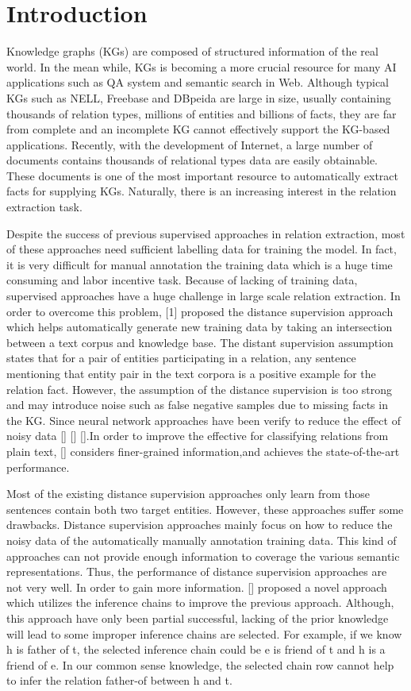 \section{Introduction}
Knowledge graphs (KGs) are composed of structured information of the real world. In the mean while, KGs is becoming a more crucial resource for many AI applications such as QA system and semantic search in Web. Although typical KGs such as NELL, Freebase and DBpeida are large in size, usually containing thousands of relation types, millions of entities and billions of facts, they are far from complete and an incomplete KG cannot effectively support the KG-based applications. Recently, with the development of Internet, a large number of documents contains thousands of relational types data are easily obtainable. These documents is one of the most important resource to automatically extract facts for supplying KGs. Naturally, there is an increasing interest in the relation extraction task.

Despite the success of previous supervised approaches in relation extraction, most of these approaches need sufficient labelling data for training the model. In fact, it is very difficult for manual annotation the training data which is a huge time consuming and labor incentive task. Because of lacking of training data, supervised approaches have a huge challenge in large scale relation extraction. In order to overcome this problem, [1] proposed the distance supervision approach which helps automatically generate new training data by taking an intersection between a text corpus and knowledge base. The distant supervision assumption states that for a pair of entities participating in a relation, any sentence mentioning that entity pair in the text corpora is a positive example for the relation fact. However, the assumption of the distance supervision is too strong and may introduce noise such as false negative samples due to missing facts in the KG. Since neural network approaches have been verify to reduce the effect of noisy data [] [] [].In order to improve the effective for classifying relations from plain text, [] considers finer-grained information,and achieves the state-of-the-art performance.

Most of the existing distance supervision approaches only learn from those sentences contain both two target entities. However, these approaches suffer some drawbacks. Distance supervision approaches mainly focus on how to reduce the noisy data of the automatically manually annotation training data. This kind of approaches can not provide enough information to coverage the various semantic representations. Thus, the performance of distance supervision approaches are not very well. In order to gain more information. [] proposed a novel approach which utilizes the inference chains to improve the previous approach. Although, this approach have only been partial successful, lacking of the prior knowledge will lead to some improper inference chains are selected. For example, if we know h is father of t, the selected inference chain could be e is friend of t and h is a friend of e. In our common sense knowledge, the selected chain row cannot help to infer the relation father-of between h and t.

